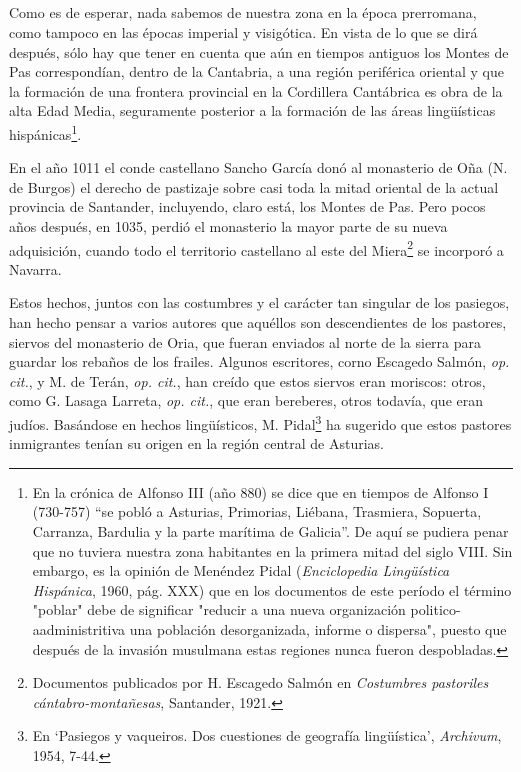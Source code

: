 \documentclass[11pt,spanish,b5paper]{book}
\begin{document}
\subsection{} Como es de esperar, nada sabemos de nuestra zona en la época prerromana, como tampoco en las épocas imperial y visigótica. En vista de lo que se dirá después, sólo hay que tener en cuenta que aún en tiempos antiguos los Montes de Pas correspondían, dentro de la Cantabria, a una región periférica oriental y que la formación de una frontera provincial en la Cordillera Cantábrica es obra de la alta Edad Media, seguramente posterior a la formación de las áreas lingüísticas hispánicas\footnote{En la crónica de Alfonso III (año 880) se dice que en tiempos de Alfonso I (730-757) ``se pobló a Asturias, Primorias, Liébana, Trasmiera, Sopuerta, Carranza, Bardulia y la parte marítima de Galicia''. De aquí se pudiera penar que no tuviera nuestra zona habitantes en la primera mitad del siglo VIII. Sin embargo, es la opinión de Menéndez Pidal (\emph{Enciclopedia Lingüística Hispánica}, 1960, pág. XXX) que en los documentos de este período el término "poblar" debe de significar "reducir a una nueva organización politico-aadministritiva una población desorganizada, informe o dispersa", puesto que después de la invasión musulmana estas regiones nunca fueron despobladas.}.

En el año 1011 el conde castellano Sancho García donó al monasterio de Oña (N. de Burgos) el derecho de pastizaje sobre casi toda la mitad oriental de la actual provincia de Santander, incluyendo, claro está, los Montes de Pas. Pero pocos años después, en 1035, perdió el monasterio la mayor parte de su nueva adquisición, cuando todo el territorio castellano al este del Miera\footnote{Documentos publicados por H. Escagedo Salmón en \emph{Costumbres
pastoriles cántabro-montañesas}, Santander, 1921.} se incorporó a Navarra.

Estos hechos, juntos con las costumbres y el carácter tan singular de los pasiegos, han hecho pensar a varios autores que aquéllos son descendientes de los pastores, siervos del monasterio de Oria, que fueran enviados al norte de la sierra para guardar los rebaños de los frailes.
Algunos escritores, corno Escagedo Salmón, \emph{op. cit.}, y M. de Terán, \emph{op. cit.}, han creído que estos siervos eran moriscos: otros, como G. Lasaga Larreta, \emph{op. cit.}, que eran bereberes, otros todavía, que eran judíos. Basándose en hechos lingüísticos, M. Pidal\footnote{En `Pasiegos y vaqueiros. Dos cuestiones de geografía lingüística', \emph{Archivum}, 1954, 7-44.} ha sugerido que estos pastores inmigrantes tenían su origen en la región central de Asturias.
\end{document}
